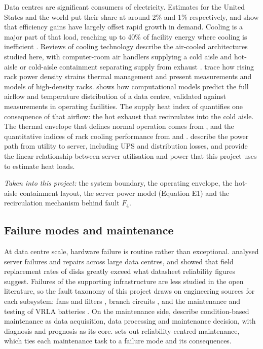 Data centres are significant consumers of electricity. Estimates for the United States \parencite{shehabi2016} and the world \parencite{masanet2020} put their share at around 2\% and 1\% respectively, and \textcite{masanet2020} show that efficiency gains have largely offset rapid growth in demand. Cooling is a major part of that load, reaching up to 40\% of facility energy where cooling is inefficient \parencite{capozzoli2015}. Reviews of cooling technology describe the air-cooled architectures studied here, with computer-room air handlers supplying a cold aisle and hot-aisle or cold-aisle containment separating supply from exhaust \parencite{ebrahimi2014,capozzoli2015}. \textcite{schmidt2005} trace how rising rack power density strains thermal management and present measurements and models of high-density racks. \textcite{patankar2010} shows how computational models predict the full airflow and temperature distribution of a data centre, validated against measurements in operating facilities. The supply heat index of \textcite{sharma2002} quantifies one consequence of that airflow: the hot exhaust that recirculates into the cold aisle. The thermal envelope that defines normal operation comes from \textcite{ashrae2021}, and the quantitative indices of rack cooling performance from \textcite{sharma2002} and \textcite{herrlin2005}. \textcite{barroso2018} describe the power path from utility to server, including UPS and distribution losses, and \textcite{fan2007} provide the linear relationship between server utilisation and power that this project uses to estimate heat loads.

\emph{Taken into this project:} the system boundary, the operating envelope, the hot-aisle containment layout, the server power model (Equation E1) and the recirculation mechanism behind fault $F_4$.

\subsection{Failure modes and maintenance}

At data centre scale, hardware failure is routine rather than exceptional. \textcite{vishwanath2010} analysed server failures and repairs across large data centres, and \textcite{schroeder2007} showed that field replacement rates of disks greatly exceed what datasheet reliability figures suggest. Failures of the supporting infrastructure are less studied in the open literature, so the fault taxonomy of this project draws on engineering sources for each subsystem: fans and filters \parencite{ashraehvac2020}, branch circuits \parencite{nfpa702023}, and the maintenance and testing of VRLA batteries \parencite{ieee1188}. On the maintenance side, \textcite{jardine2006} describe condition-based maintenance as data acquisition, data processing and maintenance decision, with diagnosis and prognosis as its core. \textcite{moubray1997} sets out reliability-centred maintenance, which ties each maintenance task to a failure mode and its consequences.

